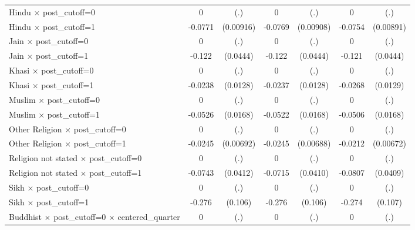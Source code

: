 \begin{table}[htbp]
\begin{tabular}{l*{3}{cc}}
Hindu $\times$ post\_cutoff=0&           0         &         (.)&           0         &         (.)&           0         &         (.)\\
Hindu $\times$ post\_cutoff=1&     -0.0771\sym{***}&   (0.00916)&     -0.0769\sym{***}&   (0.00908)&     -0.0754\sym{***}&   (0.00891)\\
Jain $\times$ post\_cutoff=0&           0         &         (.)&           0         &         (.)&           0         &         (.)\\
Jain $\times$ post\_cutoff=1&      -0.122\sym{**} &    (0.0444)&      -0.122\sym{**} &    (0.0444)&      -0.121\sym{**} &    (0.0444)\\
Khasi $\times$ post\_cutoff=0&           0         &         (.)&           0         &         (.)&           0         &         (.)\\
Khasi $\times$ post\_cutoff=1&     -0.0238         &    (0.0128)&     -0.0237         &    (0.0128)&     -0.0268\sym{*}  &    (0.0129)\\
Muslim $\times$ post\_cutoff=0&           0         &         (.)&           0         &         (.)&           0         &         (.)\\
Muslim $\times$ post\_cutoff=1&     -0.0526\sym{**} &    (0.0168)&     -0.0522\sym{**} &    (0.0168)&     -0.0506\sym{**} &    (0.0168)\\
Other Religion $\times$ post\_cutoff=0&           0         &         (.)&           0         &         (.)&           0         &         (.)\\
Other Religion $\times$ post\_cutoff=1&     -0.0245\sym{***}&   (0.00692)&     -0.0245\sym{***}&   (0.00688)&     -0.0212\sym{**} &   (0.00672)\\
Religion not stated $\times$ post\_cutoff=0&           0         &         (.)&           0         &         (.)&           0         &         (.)\\
Religion not stated $\times$ post\_cutoff=1&     -0.0743         &    (0.0412)&     -0.0715         &    (0.0410)&     -0.0807\sym{*}  &    (0.0409)\\
Sikh $\times$ post\_cutoff=0&           0         &         (.)&           0         &         (.)&           0         &         (.)\\
Sikh $\times$ post\_cutoff=1&      -0.276\sym{**} &     (0.106)&      -0.276\sym{**} &     (0.106)&      -0.274\sym{*}  &     (0.107)\\
Buddhist $\times$ post\_cutoff=0 $\times$ centered\_quarter&           0         &         (.)&           0         &         (.)&           0         &         (.)\\

\end{tabular}
\end{table}
